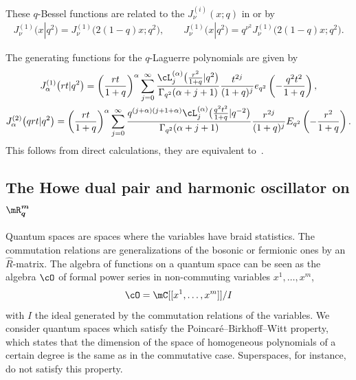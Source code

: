 These $q$-Bessel functions are related to the $J^{(i)}_\nu(x;q)$ in \cite[(1.13) and (1.17)]{MR0649849}  or \cite[Exercise~1.24]{MR1052153} by
\begin{gather*}
J^{(1)}_\nu\big(x|q^2\big)=J^{(1)}_\nu\big({2(1-q)}x;q^2\big),\qquad J^{(1)}_\nu\big(x|q^2\big)=q^{\nu^2}J^{(1)}_\nu\big(2(1-q)x;q^2\big).
\end{gather*}



The generating functions for the $q$-Laguerre polynomials are given by
\begin{gather}
\label{BesselLag1}
J_\alpha^{(1)}\big(rt|q^2\big) = \left(\frac{rt}{1+q}\right)^{\alpha}\sum_{j=0}^\infty\frac{\cL_j^{(\alpha)}\big(\frac{r^2}{1+q}|q^2\big)}{\Gamma_{q^2}(\alpha+j+1)}
\frac{t^{2j}}{(1+q)^j}e_{q^2}\left(-\frac{q^2t^2}{1+q}\right),\\
\label{BesselLag2}
J_\alpha^{(2)}\big(qrt|q^2\big) = \left(\frac{rt}{1+q}\right)^{\alpha}\sum_{j=0}^\infty\frac{q^{(j+\alpha)(j+1+\alpha)}\cL_j^{(\alpha)}
\big(\frac{q^2t^2}{1+q}|q^{-2}\big)}{\Gamma_{q^2}(\alpha+j+1)}\frac{r^{2j}}{(1+q)^j}E_{q^2}\left(-\frac{r^2}{1+q}\right).
\end{gather}
This follows from direct calculations, they are equivalent to~\cite[formulas~(3.20.11) and (3.21.13)]{Koekoek}.



\subsection[The Howe dual pair and harmonic oscillator on $\mR^m_q$]{The Howe dual pair and harmonic oscillator on $\boldsymbol{\mR^m_q}$}

Quantum spaces are spaces where the variables have braid statistics. The commutation relations are generalizations of the bosonic or fermionic ones by an $\hat{R}$-matrix. The algebra of functions on a quantum space can be seen as the algebra $\cO$ of formal power series in non-commuting variables $x^1,\dots,x^m$,
\begin{gather*}
\cO = \mC[[x^1,\dots,x^m]]/I
\end{gather*}
with $I$ the ideal generated by the commutation relations of the variables. We consider quantum spaces which satisfy the Poincar\'e--Birkhof\/f--Witt property, which states that the dimension of the space of homogeneous polynomials of a certain degree is the same as in the commutative case. Superspaces, for instance, do not satisfy this property.

